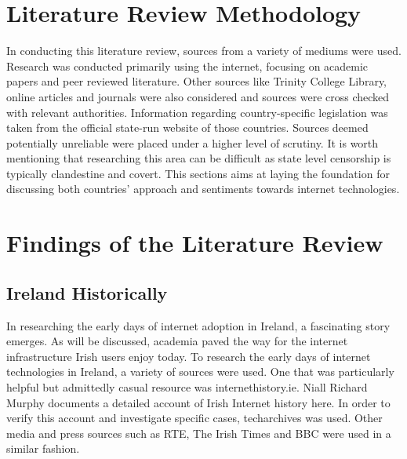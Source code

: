 \section{Literature Review Methodology}

In conducting this literature review, sources from a variety of mediums were used. Research was conducted primarily using the internet, focusing on academic papers and peer reviewed literature. Other sources like Trinity College Library, online articles and journals were also considered and sources were cross checked with relevant authorities. Information regarding country-specific legislation was taken from the official state-run website of those countries. Sources deemed potentially unreliable were placed under a higher level of scrutiny. It is worth mentioning that researching this area can be difficult as state level censorship is typically clandestine and covert. This sections aims at laying the foundation for discussing both countries' approach and sentiments towards internet technologies. 


\section{Findings of the Literature Review}
\subsection{Ireland Historically }
In researching the early days of internet adoption in Ireland, a fascinating story emerges. As will be discussed, academia paved the way for the internet infrastructure Irish users enjoy today. To research the early days of internet technologies in Ireland, a variety of sources were used. One that was particularly helpful but admittedly casual resource was internethistory.ie. \cite{InternetHistoryIE} Niall Richard Murphy documents a detailed account of Irish Internet history here. In order to verify this account and investigate specific cases, techarchives \cite{TechArchivesIE} was used. Other media and press sources such as RTE, The Irish Times and BBC were used in a similar fashion.

